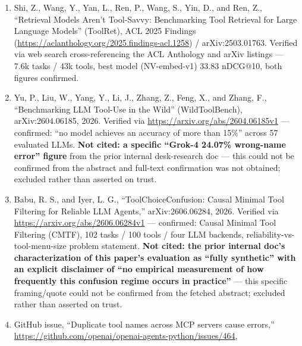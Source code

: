 \begin{itemize}
\begin{enumerate}
    ``Tools are under-documented: Simple Document Expansion Boosts Tool
    Retrieval'' (Tool-DE), arXiv:2510.22670, 2025 (arXiv ID year prefix
    ``25'' = 2025 --- corrected in second-pass audit; originally
    mislabeled 2026). Verified via \url{https://arxiv.org/abs/2510.22670} ---
    Tool-Embed/Tool-Rank, SOTA retrieval gains from LLM-driven document
    expansion, confirmed against the abstract. \nocite{lu2025toolde}
  \item
    Shi, Z., Wang, Y., Yan, L., Ren, P., Wang, S., Yin, D., and Ren, Z.,
    ``Retrieval Models Aren't Tool-Savvy: Benchmarking Tool Retrieval
    for Large Language Models'' (ToolRet), ACL 2025 Findings
    (\url{https://aclanthology.org/2025.findings-acl.1258}) /
    arXiv:2503.01763. Verified via web search cross-referencing the ACL
    Anthology and arXiv listings --- 7.6k tasks / 43k tools, best model
    (NV-embed-v1) 33.83 nDCG@10, both figures confirmed. \nocite{shi2025toolret}
  \item
    Yu, P., Liu, W., Yang, Y., Li, J., Zhang, Z., Feng, X., and Zhang,
    F., ``Benchmarking LLM Tool-Use in the Wild'' (WildToolBench),
    arXiv:2604.06185, 2026. Verified via
    \url{https://arxiv.org/abs/2604.06185v1} --- confirmed: ``no model
    achieves an accuracy of more than 15\%'' across 57 evaluated LLMs.
    \textbf{Not cited: a specific ``Grok-4 24.07\% wrong-name error''
    figure} from the prior internal desk-research doc --- this could not
    be confirmed from the abstract and full-text confirmation was not
    obtained; excluded rather than asserted on trust. \nocite{yu2026wildtool}
  \item
    Babu, R. S., and Iyer, L. G., ``ToolChoiceConfusion: Causal Minimal
    Tool Filtering for Reliable LLM Agents,'' arXiv:2606.06284, 2026.
    Verified via \url{https://arxiv.org/abs/2606.06284v1} --- confirmed:
    Causal Minimal Tool Filtering (CMTF), 102 tasks / 100 tools / four
    LLM backends, reliability-vs-tool-menu-size problem statement.
    \textbf{Not cited: the prior internal doc's characterization of this
    paper's evaluation as ``fully synthetic'' with an explicit
    disclaimer of ``no empirical measurement of how frequently this
    confusion regime occurs in practice''} --- this specific
    framing/quote could not be confirmed from the fetched abstract;
    excluded rather than asserted on trust. \nocite{babu2026toolchoice}
  \item
    GitHub issue, ``Duplicate tool names across MCP servers cause
    errors,'' \url{https://github.com/openai/openai-agents-python/issues/464},

\end{enumerate}
\end{itemize}
